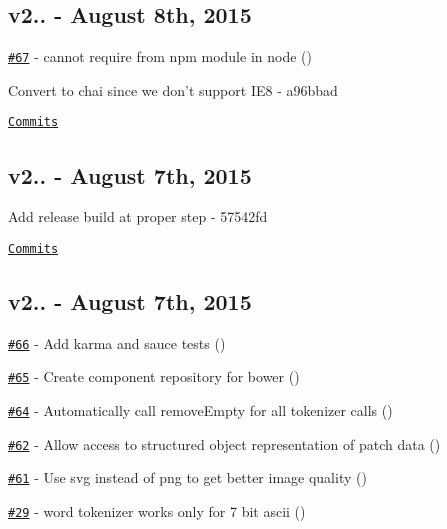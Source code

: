 \subsection*{v2.. -\/ August 8th, 2015}


\begin{DoxyItemize}
\item \href{https://github.com/kpdecker/jsdiff/issues/67}{\tt \#67} -\/ cannot require from npm module in node (\href{https://api.github.com/users/commenthol}{\tt })
\item Convert to chai since we don’t support I\+E8 -\/ a96bbad
\end{DoxyItemize}

\href{https://github.com/kpdecker/jsdiff/compare/v2.0.1...v2.0.2}{\tt Commits}

\subsection*{v2.. -\/ August 7th, 2015}


\begin{DoxyItemize}
\item Add release build at proper step -\/ 57542fd
\end{DoxyItemize}

\href{https://github.com/kpdecker/jsdiff/compare/v2.0.0...v2.0.1}{\tt Commits}

\subsection*{v2.. -\/ August 7th, 2015}


\begin{DoxyItemize}
\item \href{https://github.com/kpdecker/jsdiff/issues/66}{\tt \#66} -\/ Add karma and sauce tests (\href{https://api.github.com/users/kpdecker}{\tt })
\item \href{https://github.com/kpdecker/jsdiff/issues/65}{\tt \#65} -\/ Create component repository for bower (\href{https://api.github.com/users/kpdecker}{\tt })
\item \href{https://github.com/kpdecker/jsdiff/issues/64}{\tt \#64} -\/ Automatically call remove\+Empty for all tokenizer calls (\href{https://api.github.com/users/kpdecker}{\tt })
\item \href{https://github.com/kpdecker/jsdiff/pull/62}{\tt \#62} -\/ Allow access to structured object representation of patch data (\href{https://api.github.com/users/bittrance}{\tt })
\item \href{https://github.com/kpdecker/jsdiff/pull/61}{\tt \#61} -\/ Use svg instead of png to get better image quality (\href{https://api.github.com/users/PeterDaveHello}{\tt })
\item \href{https://github.com/kpdecker/jsdiff/issues/29}{\tt \#29} -\/ word tokenizer works only for 7 bit ascii (\href{https://api.github.com/users/plasmagunman}{\tt })
\end{DoxyItemize}

